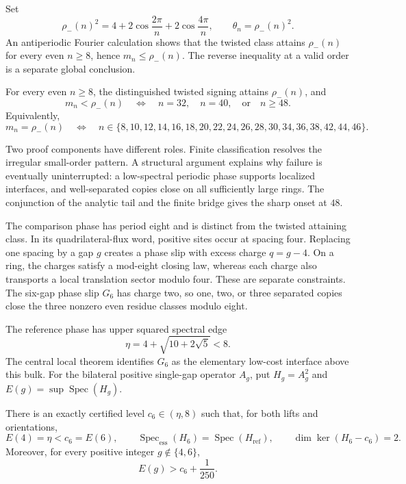 Set
\[
\rho_-(n)^2=4+2\cos\frac{2\pi}{n}+2\cos\frac{4\pi}{n},
\qquad \theta_n=\rho_-(n)^2.
\]
An antiperiodic Fourier calculation shows that the twisted class attains
\(\rho_-(n)\) for every even \(n\geq8\), hence \(m_n\leq\rho_-(n)\). The
reverse inequality at a valid order is a separate global conclusion.

\begin{theorem}
\label{thm:complete-classification}
For every even \(n\geq8\), the distinguished twisted signing attains
\(\rho_-(n)\), and
\[
m_n<\rho_-(n)
\quad\Longleftrightarrow\quad
n=32,\quad n=40,\quad\text{or}\quad n\geq48.
\]
Equivalently,
\[
m_n=\rho_-(n)
\quad\Longleftrightarrow\quad
n\in\{8,10,12,14,16,18,20,22,24,26,28,30,34,36,38,42,44,46\}.
\]
\end{theorem}

Two proof components have different roles. Finite classification resolves
the irregular small-order pattern. A structural argument explains why
failure is eventually uninterrupted: a low-spectral periodic phase supports
localized interfaces, and well-separated copies close on all sufficiently
large rings. The conjunction of the analytic tail and the finite bridge gives
the sharp onset at \(48\).

The comparison phase has period eight and is distinct from the twisted
attaining class. In its quadrilateral-flux word, positive sites occur at
spacing four. Replacing one spacing by a gap \(g\) creates a phase slip with
excess charge \(q=g-4\). On a ring, the charges satisfy a mod-eight closing
law, whereas each charge also transports a local translation sector modulo
four. These are separate constraints. The six-gap phase slip \(G_6\) has
charge two, so one, two, or three separated copies close the three nonzero
even residue classes modulo eight.

The reference phase has upper squared spectral edge
\[
\eta=4+\sqrt{10+2\sqrt5}<8.
\]
The central local theorem identifies \(G_6\) as the elementary low-cost
interface above this bulk. For the bilateral positive single-gap operator
\(A_g\), put \(H_g=A_g^2\) and
\(E(g)=\sup\operatorname{Spec}(H_g)\).

\begin{theorem}
\label{thm:single-gap-hierarchy}
There is an exactly certified level \(c_6\in(\eta,8)\) such that, for both
lifts and orientations,
\[
E(4)=\eta<c_6=E(6),
\qquad
\operatorname{Spec}_{\mathrm{ess}}(H_6)
=\operatorname{Spec}(H_{\mathrm{ref}}),
\qquad
\dim\ker(H_6-c_6)=2.
\]
Moreover, for every positive integer \(g\notin\{4,6\}\),
\[
E(g)>c_6+\frac1{250}.
\]
\end{theorem}

